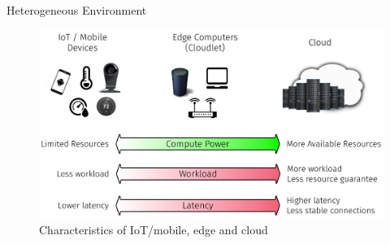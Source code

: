 
\begin{frame}{Heterogeneous Environment}
  \vspace{1em}
  \begin{figure}
    \centering
    \includegraphics[width=0.95\linewidth]{figures/heterogeneous.pdf}
    \caption{Characteristics of IoT/mobile, edge and cloud}
  \end{figure}
\end{frame}

